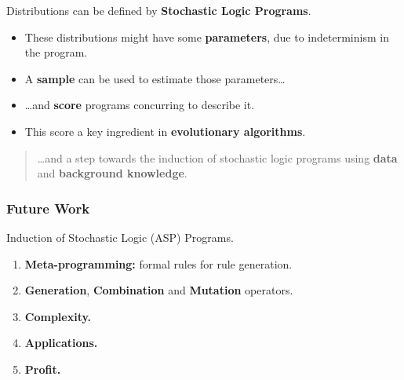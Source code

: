\documentclass[bigger]{beamer}
\begin{document}
%
\begin{frame}
    Distributions can be defined by \textbf{Stochastic Logic Programs}.
    \begin{itemize}
        \item These distributions might have some \textbf{parameters}, due to indeterminism in the program.
        \item A \textbf{sample} can be used to estimate those parameters\ldots
        \item \ldots and \textbf{score} programs concurring to describe it.
        \item This score a key ingredient in \textbf{evolutionary algorithms}.
    \end{itemize}
    \begin{quotation}
        \ldots and a step towards the \alert{induction of stochastic logic programs} using \textbf{data} and \textbf{background knowledge}.
    \end{quotation}
\end{frame}
%
\begin{frame}
    \frametitle{Future Work}
    \vfill
    \begin{center}
        Induction of Stochastic Logic (ASP) Programs.
    \end{center}
    \vfill
    \begin{enumerate}
        \item \textbf{Meta-programming:} formal rules for rule generation.
        \item \textbf{Generation}, \textbf{Combination} and \textbf{Mutation} operators.
        \item \textbf{Complexity.}
        \item \textbf{Applications.}
        \item \textbf{Profit.}
    \end{enumerate}
    \vfill
\end{frame}
%
\end{document}
